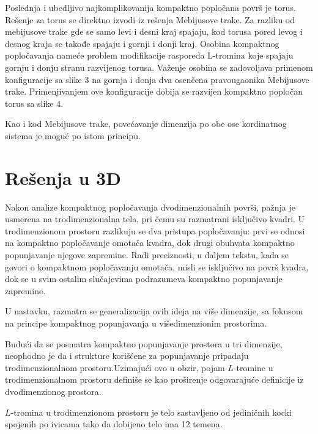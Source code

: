 Poslednja i ubedljivo najkomplikovanija kompaktno popločana površ je torus. Rešenje za torus se direktno izvodi iz rešenja Mebijusove trake. Za razliku od mebijusove trake gde se samo levi i desni kraj spajaju, kod torusa pored levog i desnog kraja se takođe spajaju i gornji i donji kraj. Osobina kompaktnog popločavanja nameće problem modifikacije rasporeda L-tromina koje spajaju gornju i donju stranu razvijenog torusa. Važenje osobina se zadovoljava primenom konfiguracije sa slike 3 na gornja i donja dva osenčena pravougaonika Mebijusove trake. Primenjivanjem ove konfiguracije dobija se razvijen kompaktno popločan torus sa slike 4.



Kao i kod Mebijusove trake, povećavanje dimenzija po obe ose kordinatnog sistema je moguć po istom principu.


\section{Rešenja u 3D}

Nakon analize kompaktnog popločavanja dvodimenzionalnih površi, pažnja je usmerena na trodimenzionalna tela, pri čemu su razmatrani isključivo kvadri. U trodimenzionom prostoru razlikuju se dva pristupa popločavanju: prvi se odnosi na kompaktno popločavanje omotača kvadra, dok drugi obuhvata kompaktno popunjavanje njegove zapremine. Radi preciznosti, u daljem tekstu, kada se govori o kompaktnom popločavanju omotača, misli se isključivo na površ kvadra, dok se u svim ostalim slučajevima podrazumeva kompaktno popunjavanje zapremine.

U nastavku, razmatra se generalizacija ovih ideja na više dimenzije, sa fokusom na principe kompaktnog popunjavanja u višedimenzionim prostorima.






Budući da se posmatra kompaktno popunjavanje prostora u tri dimenzije, neophodno je da i strukture korišćene za popunjavanje pripadaju trodimenzionalnom prostoru.Uzimajući ovo u obzir, pojam $L$-tromine u trodimenzionalnom prostoru definiše se kao proširenje odgovarajuće definicije iz dvodimenzionog prostora.
\begin{Definition}
    $L$-tromina u trodimenzionom prostoru je telo sastavljeno od jediničnih kocki spojenih po ivicama tako da dobijeno telo ima 12 temena.
\end{Definition}

